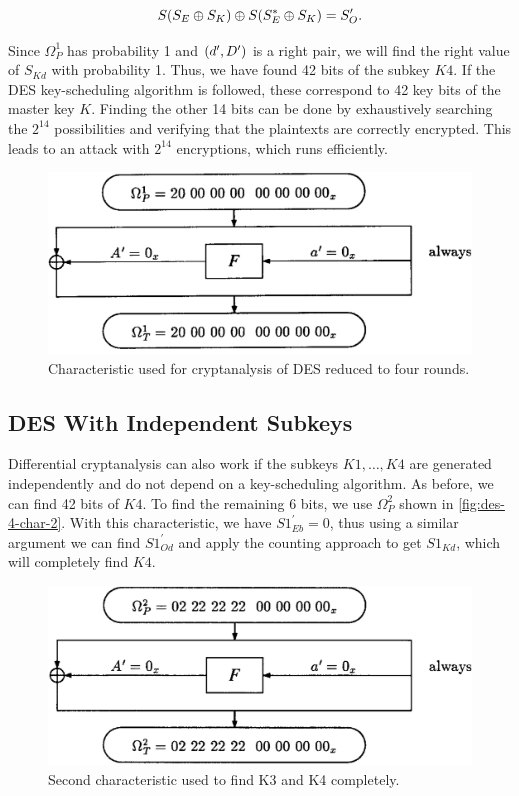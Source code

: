 \documentclass[twoside]{article}
\begin{document}
\begin{equation}
    S(S_{E} \oplus S_{K}) \oplus S(S^*_{E} \oplus S_{K}) = S^\prime_{O}.
    \label{eq:des-ki}
\end{equation}

Since \(\Omega_P^1\) has probability 1 and \((d^\prime, D^\prime)\) is a
right pair, we will find the right value of \(S_{Kd}\) with probability 1. Thus,
we have found 42 bits of the subkey \(K4\). If the DES key-scheduling algorithm
is followed, these correspond to 42 key bits of the master key \(K\). Finding
the other 14 bits can be done by exhaustively searching the \(2^{14}\)
possibilities and verifying that the plaintexts are correctly encrypted. This
leads to an attack with \(2^{14}\) encryptions, which runs efficiently.

\begin{figure}[!ht]
    \centering
    \includegraphics[width=0.5\linewidth]{images/des_4round_char.png}
    \caption{Characteristic used for cryptanalysis of DES reduced to four rounds.}
    \label{fig:des-4-char}
\end{figure}

\subsection{DES With Independent Subkeys}

Differential cryptanalysis can also work if the subkeys \(K1,\ldots,K4\) are
generated independently and do not depend on a key-scheduling algorithm. As
before, we can find 42 bits of \(K4\). To find the remaining 6 bits, we use
\(\Omega_P^2\) shown in \autoref{fig:des-4-char-2}. With this characteristic, we
have \(S1^\prime_{Eb} = 0\), thus using a similar argument we can find
\(S1^\prime_{Od}\) and apply the counting approach to get \(S1_{Kd}\), which
will completely find \(K4\).

\begin{figure}[!ht]
    \centering
    \includegraphics[width=0.5\linewidth]{images/des_4round_char2.png}
    \caption{Second characteristic used to find K3 and K4 completely.}
    \label{fig:des-4-char-2}
\end{figure}
\end{document}
